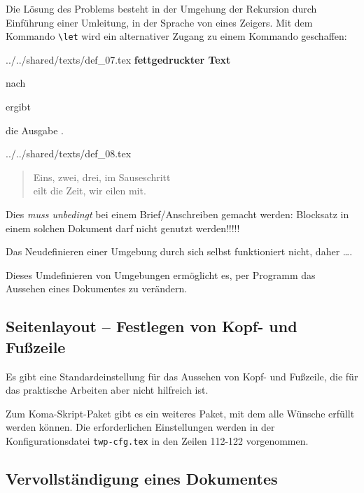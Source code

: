\documentclass[ngerman,               %
               a4paper,               %
               fleqn,                 %
                     ]{scrartcl}       %
\begin{document}
Die Lösung des Problems besteht in der Umgehung der Rekursion durch Einführung
einer Umleitung, in der Sprache von \Cee eines Zeigers. Mit dem Kommando
\lstinline|\let| wird ein alternativer Zugang zu einem Kommando geschaffen:
\begin{verbatimwrite}{../../shared/texts/def_07.tex}
\let\fettgedruckt=\textbf
\fettgedruckt{fettgedruckter Text}
\end{verbatimwrite}
nach

ergibt

die Ausgabe
.

\begin{verbatimwrite}{../../shared/texts/def_08.tex}
\let\verseorig=\verse
\let\endverseorig=\endverse
\renewenvironment{verse}{\begin{verseorig}\itshape}{\end{verseorig}}
\end{verbatimwrite}




\begin{verse}
    Eins, zwei, drei, im Sauseschritt \\
    eilt die Zeit, wir eilen mit.
\end{verse}


Dies \emph{muss unbedingt} bei einem
Brief/Anschreiben gemacht werden: Blocksatz in einem solchen Dokument darf
nicht genutzt werden!!!!!

Das Neudefinieren einer Umgebung durch sich selbst funktioniert nicht, daher
\ldots.

Dieses Umdefinieren von Umgebungen ermöglicht es, per Programm das Aussehen
eines Dokumentes zu verändern.


\subsection{Seitenlayout -- Festlegen von Kopf- und Fußzeile}

Es gibt eine Standardeinstellung für das Aussehen von  Kopf- und Fußzeile,
die für das praktische Arbeiten aber nicht hilfreich ist.

Zum Koma-Skript-Paket gibt es ein weiteres Paket, mit dem alle Wünsche
erfüllt werden können. Die erforderlichen Einstellungen werden in der
Konfigurationsdatei \texttt{twp-cfg.tex} in den Zeilen 112-122 vorgenommen.


\subsection{Vervollständigung eines Dokumentes}
\end{document}
